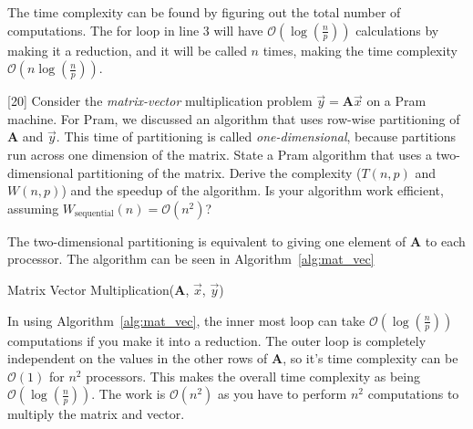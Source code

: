 \documentclass[addpoints]{exam}
\newcommand{\BigO}[1]{\mathcal{O}\left( #1\right)}
\begin{document}
\begin{questions}
\begin{solution}
The time complexity can be found by figuring out the total number of computations. The for loop in line 3 will have $\BigO{\log\left(\frac{n}{p}\right)}$ calculations by making it a reduction, and it will be called $n$ times, making the time complexity $\BigO{n\log\left(\frac{n}{p}\right)}$.

\end{solution}

\newpage

[20]
Consider the {\em matrix-vector} multiplication problem $\vec{y} = \mathbf{A}\vec{x}$ on a {\sc Pram} machine. For {\sc Pram}, we discussed an algorithm that uses row-wise partitioning of $\mathbf{A}$ and $\vec{y}$. This time of partitioning is called {\em one-dimensional}, because partitions run across one dimension of the matrix. State a {\sc Pram} algorithm that uses a two-dimensional partitioning of the matrix. Derive the complexity ($T(n,p)$ and $W(n,p)$) and the speedup of the algorithm. Is your algorithm work efficient, assuming $W_{\text{sequential}}(n)=\BigO{n^{2}}$?

\begin{solution}
The two-dimensional partitioning is equivalent to giving one element of $\mathbf{A}$ to each processor. The algorithm can be seen in Algorithm~\ref{alg:mat_vec}

\begin{algorithm}[H]
\caption{Matrix Vector Multiplication($\mathbf{A}$, $\vec{x}$, $\vec{y}$)}
\begin{algorithmic}[1]
    \ENDFOR
\ENDFOR
\end{algorithmic}
\label{alg:mat_vec}
\end{algorithm}

In using Algorithm~\ref{alg:mat_vec}, the inner most loop can take $\BigO{\log\left(\frac{n}{p}\right)}$ computations if you make it into a reduction. The outer loop is completely independent on the values in the other rows of $\mathbf{A}$, so it's time complexity can be $\BigO{1}$ for $n^{2}$ processors. This makes the overall time complexity as being $\BigO{\log\left(\frac{n}{p}\right)}$. The work is $\BigO{n^{2}}$ as you have to perform $n^{2}$ computations to multiply the matrix and vector.


\end{solution}
\end{questions}
\end{document}
